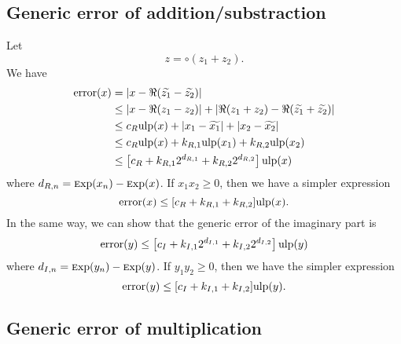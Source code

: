 \documentclass {article}
\DeclareMathOperator{\error}{error}
\newcommand {\Ulp}{{\rm ulp}}
\newcommand {\Exp}{{\rm \textsc exp}}
\begin{document}
\subsection {Generic error of addition/substraction}

Let
\[
z=\circ(z_1+z_2).
\]
We have
\begin{align*}
\error(x)&= |x-\Re(\widetilde{z_1}-\widetilde{z_2})|
\\
&\leq |x-\Re(z_1-z_2)|+|\Re(z_1+z_2)-\Re(\widetilde{z_1}+\widetilde{z_2})|
\\
&\leq c_R\Ulp(x)+|x_1-\widetilde{x_1}|+|x_2-\widetilde{x_2}|
\\
&\leq c_R\Ulp(x)+k_{R,1}\Ulp(x_1)+k_{R,2}\Ulp(x_2)
\\
&\leq \left[c_R+k_{R,1}2^{d_{R,1}}+k_{R,2}2^{d_{R,2}}\right]\Ulp(x)
\end{align*}
where $d_{R,n}=\Exp(x_n)-\Exp(x)$. If $x_1x_2 \geq 0$, then we have a simpler
expression
\[
\error(x) \leq [c_R+k_{R,1}+k_{R,2}] \Ulp(x).
\]
In the same way, we can show that the generic error of the imaginary part is
\[
\error (y) \leq \left[c_I+k_{I,1}2^{d_{I,1}}+k_{I,2}2^{d_{I,2}}\right] \Ulp(y)
\]
where $d_{I,n}=\Exp(y_n)-\Exp(y)$. If $y_1y_2 \geq 0$, then we have the
simpler expression
\[
\error(y) \leq [c_I+k_{I,1}+k_{I,2}] \Ulp(y).
\]


\subsection {Generic error of multiplication}
\end{document}
